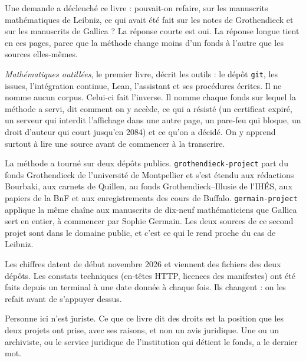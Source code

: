 Une demande a déclenché ce livre : pouvait-on refaire,
sur les manuscrits mathématiques de Leibniz, ce qui avait été fait sur les notes de
Grothendieck et sur les manuscrits de Gallica ? La réponse courte est oui. La réponse
longue tient en ces pages, parce que la méthode change moins d'un fonds à l'autre que les
sources elles-mêmes.

\emph{Mathématiques outillées}, le premier livre, décrit les outils : le dépôt \texttt{git},
les issues, l'intégration continue, Lean, l'assistant et ses procédures écrites. Il ne
nomme aucun corpus. Celui-ci fait l'inverse. Il nomme chaque fonds sur lequel la méthode
a servi, dit comment on y accède, ce qui a résisté (un certificat expiré, un serveur qui
interdit l'affichage dans une autre page, un pare-feu qui bloque, un droit d'auteur qui
court jusqu'en 2084) et ce qu'on a décidé. On y apprend surtout à lire une source avant
de commencer à la transcrire.

La méthode a tourné sur deux dépôts publics. \texttt{grothendieck-project} part du fonds
Grothendieck de l'université de Montpellier et s'est étendu aux rédactions Bourbaki, aux
carnets de Quillen, au fonds Grothendieck--Illusie de l'IHÉS, aux papiers de la BnF et aux
enregistrements des cours de Buffalo. \texttt{germain-project} applique la même chaîne aux
manuscrits de dix-neuf mathématiciens que Gallica sert en entier, à commencer par Sophie
Germain. Les deux sources de ce second projet sont dans le domaine public, et c'est ce
qui le rend proche du cas de Leibniz.

Les chiffres datent de début novembre 2026 et viennent des fichiers des deux dépôts. Les
constats techniques (en-têtes HTTP, licences des manifestes) ont été faits depuis un
terminal à une date donnée à chaque fois. Ils changent : on les refait avant de
s'appuyer dessus.

\begin{noteblock}
Personne ici n'est juriste. Ce que ce livre dit des droits est la position que les deux
projets ont prise, avec ses raisons, et non un avis juridique. Une ou un archiviste, ou le
service juridique de l'institution qui détient le fonds, a le dernier mot.
\end{noteblock}
